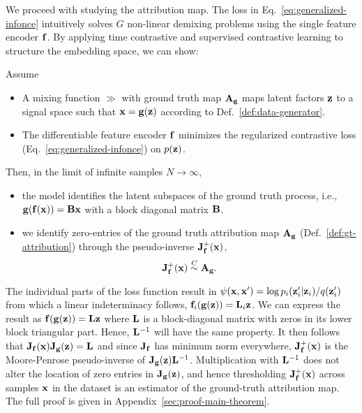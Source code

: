     We proceed with studying the attribution map. The loss in Eq.~\ref{eq:generalized-infonce} intuitively solves $G$ non-linear demixing problems using the single feature encoder $\ff$. By applying time contrastive and supervised contrastive learning to structure the embedding space, we can show:
    \begin{theorem}\label{thm:main-theorem}
        Assume
        \begin{itemize}
            \item A mixing function $\gg$ with ground truth map $\AA_\gg$ maps latent factors $\zz$ to a signal space such that $\xx = \gg(\zz)$ according to Def.~\ref{def:data-generator}.
            \item The differentiable feature encoder $\ff$ minimizes the regularized contrastive loss (Eq.~\ref{eq:generalized-infonce}) on  $p(\zz)$.
        \end{itemize}
        Then, in the limit of infinite samples $N \rightarrow \infty$,
        \begin{itemize}
            \item the model identifies the latent subspaces of the ground truth process, i.e., $\gg(\ff(\xx)) = \BB \xx$
                with a block diagonal matrix $\BB$. 
            \item we identify zero-entries of the ground truth attribution map $\AA_\gg$ (Def.~\ref{def:gt-attribution})
                through the pseudo-inverse $\JJ_\ff^+(\xx)$,
                \begin{equation}
                    \JJ_\ff^+ (\xx) \mathrel{\mathop{\sim}^C} \AA_\gg.
                \end{equation}
        \end{itemize}
        \vspace{-3pt}
        \begin{proofsketch}
            The individual parts of the loss function result in $\psi(\xx, \xx') = \log p_i(\zz'_i | \zz_i) / q(\zz'_i)$ from which a linear indeterminacy follows, $\ff_i(\gg(\zz)) = \LL_i \zz$. We can express the result as $\ff(\gg(\zz)) = \LL \zz$ where $\LL$ is a block-diagonal matrix with zeros in its lower block triangular part. Hence, $\LL^{-1}$ will have the same property. It then follows that $\JJ_\ff(\xx) \JJ_\gg(\zz) = \LL$ and since $\JJ_\ff$ has minimum norm everywhere, $\JJ_\ff^+(\xx)$ is the Moore-Penrose pseudo-inverse of $\JJ_\gg(\zz) \LL^{-1}$. Multiplication with $\LL^{-1}$ does not alter the location of zero entries in $\JJ_\gg(\zz)$, and hence thresholding $\JJ_\ff^+(\xx)$ across samples $\xx$ in the dataset is an estimator of the ground-truth attribution map.
            The full proof is given in Appendix~\ref{sec:proof-main-theorem}.
        \end{proofsketch}
    \end{theorem}

